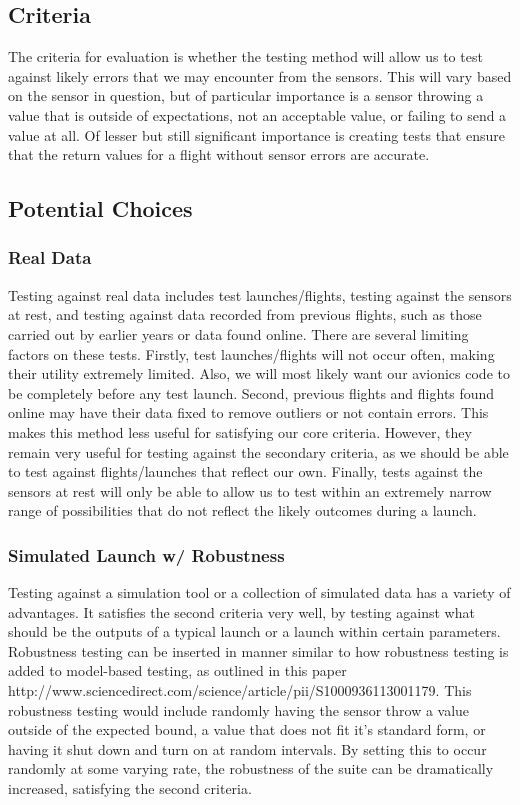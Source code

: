 \documentclass[onecolumn, draftclsnofoot,10pt, compsoc]{IEEEtran}
\begin{document}
\subsection{Criteria}
The criteria for evaluation is whether the testing method will allow us to test against likely errors that we may encounter from the sensors. This will vary based on the sensor in question, but of particular importance is a sensor throwing a value that is outside of expectations, not an acceptable value, or failing to send a value at all. Of lesser but still significant importance is creating tests that ensure that the return values for a flight without sensor errors are accurate.
\subsection{Potential Choices}
\subsubsection{Real Data}
Testing against real data includes test launches/flights, testing against the sensors at rest, and testing against data recorded from previous flights, such as those carried out by earlier years or data found online. There are several limiting factors on these tests. Firstly, test launches/flights will not occur often, making their utility extremely limited. Also, we will most likely want our avionics code to be completely before any test launch. Second, previous flights and flights found online may have their data fixed to remove outliers or not contain errors. This makes this method less useful for satisfying our core criteria. However, they remain very useful for testing against the secondary criteria, as we should be able to test against flights/launches that reflect our own. Finally, tests against the sensors at rest will only be able to allow us to test within an extremely narrow range of possibilities that do not reflect the likely outcomes during a launch.
\subsubsection{Simulated Launch w/ Robustness}
Testing against a simulation tool or a collection of simulated data has a variety of advantages. It satisfies the second criteria very well, by testing against what should be the outputs of a typical launch or a launch within certain parameters. Robustness testing can be inserted in manner similar to how robustness testing is added to model-based testing, as outlined in this paper http://www.sciencedirect.com/science/article/pii/S1000936113001179. This robustness testing would include randomly having the sensor throw a value outside of the expected bound, a value that does not fit it's standard form, or having it shut down and turn on at random intervals. By setting this to occur randomly at some varying rate, the robustness of the suite can be dramatically increased, satisfying the second criteria.
\end{document}
